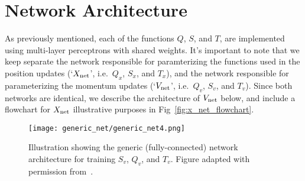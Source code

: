 \section{Network Architecture}%
\label{subsec:l2hmc_network}
As previously mentioned, each of the functions $Q$, $S$, and $T$, are
implemented using multi-layer perceptrons with shared weights.
%
It's important to note that we keep separate the network responsible for
paramterizing the functions used in the position updates (`${X_{\mathrm{net}}}$', i.e.\
$Q_x$, $S_x$, and $T_x$), and the network responsible for parameterizing the
momentum updates (`${V_{\mathrm{net}}}$', i.e.\ $Q_v$, $S_v$, and $T_v$).
%
Since both networks are identical, we describe the architecture of ${V_{\mathrm{net}}}$
below, and include a flowchart for ${X_{\mathrm{net}}}$ illustrative purposes in
Fig~\ref{fig:x_net_flowchart}.
%
%
\begin{figure}[htpb]
  \centering
  \texttt{[image: generic\_net/generic\_net4.png]}
  \caption{Illustration showing the generic (fully-connected) network
    architecture for training $S_v$, $Q_v$, and $T_v$. Figure adapted
		with permission from~\cite{joeyl2hmc}.}%
\label{fig:generic_net}
\end{figure}
%

